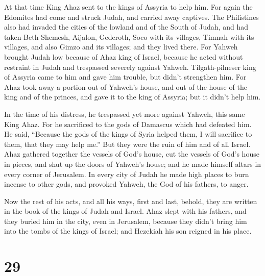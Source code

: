  At that time King Ahaz sent to the kings of Assyria to
help him.  For again the Edomites had come and struck
Judah, and carried away captives.  The Philistines also
had invaded the cities of the lowland and of the South of Judah, and had
taken Beth Shemesh, Aijalon, Gederoth, Soco with its villages, Timnah
with its villages, and also Gimzo and its villages; and they lived
there.  For Yahweh brought Judah low because of Ahaz king
of Israel, because he acted without restraint in Judah and trespassed
severely against Yahweh.  Tilgath-pilneser king of
Assyria came to him and gave him trouble, but didn't strengthen him.
 For Ahaz took away a portion out of Yahweh's house, and
out of the house of the king and of the princes, and gave it to the king
of Assyria; but it didn't help him.

 In the time of his distress, he trespassed yet more
against Yahweh, this same King Ahaz.  For he sacrificed
to the gods of Damascus which had defeated him. He said, ``Because the
gods of the kings of Syria helped them, I will sacrifice to them, that
they may help me.'' But they were the ruin of him and of all Israel.
 Ahaz gathered together the vessels of God's house, cut
the vessels of God's house in pieces, and shut up the doors of Yahweh's
house; and he made himself altars in every corner of Jerusalem.
 In every city of Judah he made high places to burn
incense to other gods, and provoked Yahweh, the God of his fathers, to
anger.

 Now the rest of his acts, and all his ways, first and
last, behold, they are written in the book of the kings of Judah and
Israel.  Ahaz slept with his fathers, and they buried him
in the city, even in Jerusalem, because they didn't bring him into the
tombs of the kings of Israel; and Hezekiah his son reigned in his place.

\hypertarget{section-28}{%
\section{29}\label{section-28}}

